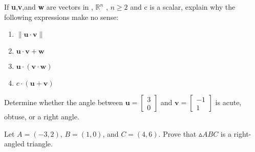\documentclass[12pt,letterpaper]{hmcpset}
\begin{document}
\begin{problem}[17]
If \textbf{u},\textbf{v},and \textbf{w} are vectors in , $\mathbb{R}^n$ , $n \geq 2$ and c is a scalar, explain why the following expressions make no sense:

\begin{enumerate}
    \item
        $\| {\mathbf{u} \cdot \mathbf{v}} \|$ \\
    \item
        $\mathbf{u}\cdot\mathbf{v} + \mathbf{w}$\\
    \item
        $\mathbf{u}\cdot (\mathbf{v}\cdot\mathbf{w})$\\
    \item
        $c\cdot (\mathbf{u} + \mathbf{v})$
\end{enumerate}

\end{problem}

\begin{solution}
\end{solution}
\newpage

\begin{problem}[18]
Determine whether the angle between $\mathbf{u} = \begin{bmatrix}
3 \\
0
\end{bmatrix} $ and $\mathbf{v} = \begin{bmatrix}
-1 \\
1
\end{bmatrix}$ is acute, obtuse, or a right angle.
\end{problem}

\begin{solution}
\end{solution}
\newpage

\begin{problem}[30]

Let $A = (-3, 2)$, $B = (1, 0)$, and $C = (4, 6)$. Prove that $\vartriangle ABC$ is a right-angled triangle.

\end{problem}

\begin{solution}
\end{solution}
\end{document}
